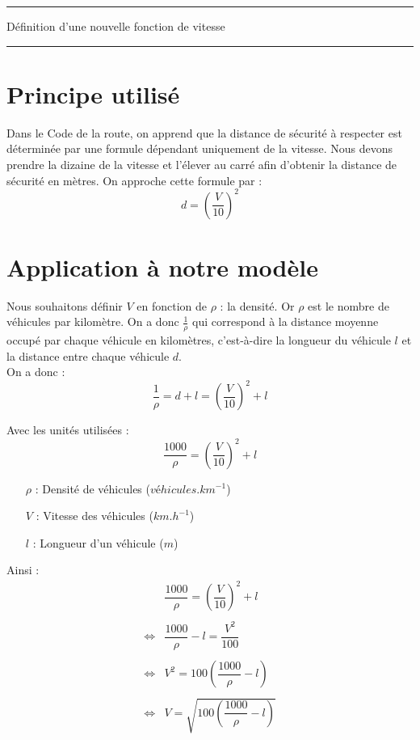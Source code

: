 \documentclass[12pt, openany]{article}
\begin{document}
\begin{center}\leavevmode
        \normalfont
        \rule[0pt]{\textwidth}{1pt}\par
        {\LARGE Définition d'une nouvelle fonction de vitesse\par}%
        \rule[0pt]{\textwidth}{1pt}\par
\end{center}

\section{Principe utilisé}

Dans le Code de la route, on apprend que la distance de sécurité à respecter est déterminée par une formule dépendant uniquement de la vitesse. Nous devons prendre la dizaine de la vitesse et l'élever au carré afin d'obtenir la distance de sécurité en mètres. On approche cette formule par :
$$ d = \left( \dfrac{V}{10} \right) ^2 $$

\section{Application à notre modèle}

Nous souhaitons définir $V$ en fonction de $\rho$ : la densité. Or $\rho$ est le nombre de véhicules par kilomètre. On a donc $\frac{1}{\rho}$ qui correspond à la distance moyenne occupé par chaque véhicule en kilomètres, c'est-à-dire la longueur du véhicule $l$ et la distance entre chaque véhicule $d$.\\
On a donc :
$$\dfrac{1}{\rho} = d + l = \left( \dfrac{V}{10} \right) ^2 + l$$

Avec les unités utilisées :
$$ \dfrac{1000}{\rho} = \left( \dfrac{V}{10} \right) ^2 + l$$
\begin{itemize}
	\item[$\rho$ :] Densité de véhicules ($véhicules.km^{-1}$)
	\item[$V$ :] Vitesse des véhicules ($km.h^{-1}$)
	\item[$l$ :] Longueur d'un véhicule ($m$)
\end{itemize}

Ainsi :
$$
\begin{array}{rl}
	&\dfrac{1000}{\rho} = \left( \dfrac{V}{10} \right) ^2 + l\\
	\\
	\Leftrightarrow & \dfrac{1000}{\rho} -l = \dfrac{V^2}{100}\\
	\\
	\Leftrightarrow & V^2 = 100 \left( \dfrac{1000}{\rho} -l \right)\\
	\\
	\Leftrightarrow & V=\sqrt{100 \left( \dfrac{1000}{\rho} -l \right)}
\end{array}
$$	
\end{document}
